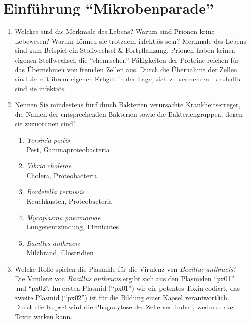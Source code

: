 
\section{Einführung ``Mikrobenparade''}
	\begin{enumerate}
		\item Welches sind die Merkmale des Lebens? Warum sind Prionen keine Lebewesen? Warum können sie trotzdem infektiös sein? \hfill \vspace{4mm}
		Merkmale des Lebens sind zum Beispiel ein Stoffwechsel \& Fortpflanzung.
		Prionen haben keinen eigenen Stoffwechsel,
		die ``chemischen'' Fähigkeiten der Proteine reichen für das Übernehmen von fremden Zellen aus.
		Durch die Übernahme der Zellen sind sie mit ihrem eigenen Erbgut in der Lage,
		sich zu vermehren - deshallb sind sie infektiös.

	\item Nennen Sie mindestens fünf durch Bakterien verursachte Krankheitserreger, die Namen der entsprechenden Bakterien sowie die Bakteriengruppen, denen sie zuzuordnen sind!
		\begin{enumerate}
			\item \emph{Yersinia pestis} \hfill \\
				Pest, Gammaproteobacteria
			\item \emph{Vibrio cholerae} \hfill \\
				Cholera, Proteobacteria
			\item \emph{Bordetella pertussis} \hfill \\
				Keuchhusten, Proteobacteria
			\item \emph{Mycoplasma pneumoniae} \hfill \\
				Lungenentzündung, Firmicutes
			\item \emph{Bacillus anthracis} \hfill \\
				Milzbrand, Clostridien
		\end{enumerate}

	\item Welche Rolle spielen die Plasmide für die Virulenz von \emph{Bacillus anthracis}?  \hfill \vspace{0.2mm} \\
			Die Virulenz von \emph{Bacillus anthracis} ergibt sich
			aus den Plasmiden ``px01'' und ``px02''.
			Im ersten Plasmid (``px01'') wir ein potentes Toxin codiert,
			das zweite Plasmid (``px02'') ist für die Bildung einer Kapsel verantwortlich.
			Durch die Kapsel wird die Phagocytose der Zelle verhindert,
			wodurch das Toxin wirken kann.


\end{enumerate}
